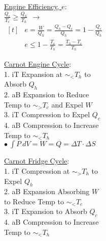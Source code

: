 \documentclass[12pt]{article}
\begin{document}
\noindent
\begin{minipage}[t]{.37\textwidth}
    \setlength{\parindent}{.5cm}
    \noindent
    \underline{Engine Efficiency, \(e\)}: \\[10pt]
     \(\frac{Q_c}{T_c} \geq \frac{Q_h}{T_h} \ \ \rightarrow \)\\[10pt]
     \(\begin{aligned}[t]
        &\boxed{ e = \frac{W}{Q_h} = \frac{Q_h - Q_c}{Q_h} = 1 - \frac{Q_c}{Q_h}}\\[5pt]
        &\boxed{ e \leq 1 - \frac{T_c}{T_h} = \frac{T_h - T_c}{T_h} }
    \end{aligned}\)    
\end{minipage}
\begin{minipage}[t]{.27\textwidth}
    \scriptsize
    \underline{Carnot Engine Cycle}:\\[5pt]
    1. iT Expansion at \(\sim_< T_h\) to \\ Absorb \(Q_h\)\\[5pt]
    2. aB Expansion to Reduce \\ Temp to \(\sim_> T_c\) and Expel \(W\)\\[5pt]
    3. iT Compression to Expel \(Q_c\)\\[5pt]
    4. aB Compression to Increase \\ Temp to \(\sim_< T_h\)\\[5pt]
    \(\bullet \ \boxed{ \int P\ dV = W = Q = \Delta T \cdot \Delta S }\)
\end{minipage}
\hspace{9pt}
\begin{minipage}[t]{.3\textwidth}
    \scriptsize
    \underline{Carnot Fridge Cycle}:\\[5pt]
    1. iT Compression at \(\sim_> T_h\) to \\ Expel \(Q_h\)\\[5pt]
    2. aB Expansion Absorbing \(W\) \\ to Reduce Temp to \(\sim_< T_c\)\\[5pt]
    3. iT Expansion to Absorb \(Q_c\)\\[5pt]
    4. aB Compression to Increase \\ Temp to \(\sim_< T_h\)
\end{minipage}
\end{document}
